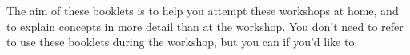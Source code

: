 The aim of these booklets is to help you attempt these workshops at home, and to explain concepts in more detail than at the workshop. You don't need to refer to use these booklets during the workshop, but you can if you'd like to.
